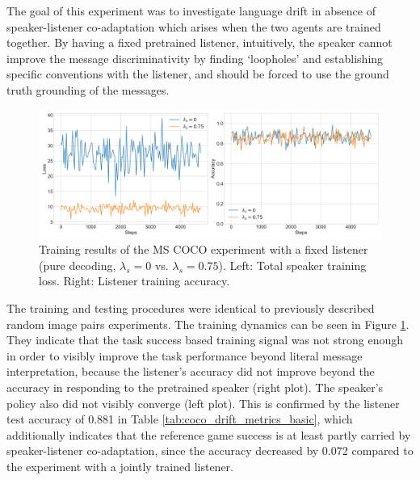 The goal of this experiment was to investigate language drift in absence of speaker-listener co-adaptation which arises when the two agents are trained together. By having a fixed pretrained listener, intuitively, the speaker cannot improve the message discriminativity by finding `loopholes' and establishing specific conventions with the listener, and should be forced to use the ground truth grounding of the messages.

\begin{figure}[h]
	\centering
	\includegraphics[width=\linewidth]{images/coco_fixedListener_baseline_random_0_075_losses.png}
	\caption{Training results of the MS COCO experiment with a fixed listener (pure decoding, $\lambda_s=0$ vs. $\lambda_s=0.75$). Left: Total speaker training loss. Right: Listener training accuracy.}
	\label{fig:coco_fixed_listener_speaker_loss_listener_acc_075}
\end{figure}

The training and testing procedures were identical to previously described random image pairs experiments. The training dynamics can be seen in Figure \ref{fig:coco_fixed_listener_speaker_loss_listener_acc_075}. They indicate that the task success based training signal was not strong enough in order to visibly improve the task performance beyond literal message interpretation, because the listener's accuracy did not improve beyond the accuracy in responding to the pretrained speaker (right plot). The speaker's policy also did not visibly converge (left plot). 
This is confirmed by the listener test accuracy of 0.881 in Table \ref{tab:coco_drift_metrics_basic}, which additionally indicates that the reference game success is at least partly carried by speaker-listener co-adaptation, since the accuracy decreased by 0.072 compared to the experiment with a jointly trained listener. 

